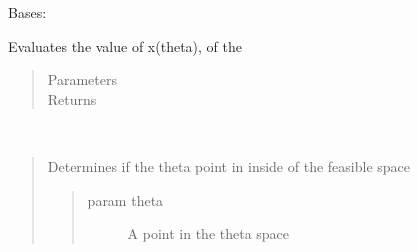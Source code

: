 \documentclass[letterpaper,10pt,english]{sphinxmanual}
\begin{document}
\begin{fulllineitems}
\label{\detokenize{mpo.upop:mpo.upop.point_location.PointLocation}}
\sphinxAtStartPar
Bases: 

\begin{fulllineitems}
\label{\detokenize{mpo.upop:mpo.upop.point_location.PointLocation.evaluate}}
\sphinxAtStartPar
Evaluates the value of x(theta), of the
\begin{quote}\begin{description}
\item[{Parameters}] \leavevmode
\sphinxAtStartPar
{} \textendash{} 

\item[{Returns}] \leavevmode
\sphinxAtStartPar


\end{description}\end{quote}

\end{fulllineitems}


\begin{fulllineitems}
\label{\detokenize{mpo.upop:mpo.upop.point_location.PointLocation.is_inside}}~\begin{quote}

\sphinxAtStartPar
Determines if the theta point in inside of the feasible space
\begin{quote}\begin{description}
\item[{param theta}] \leavevmode
\sphinxAtStartPar
A point in the theta space


\end{description}
\end{quote}
\end{quote}
\end{fulllineitems}
\end{fulllineitems}
\end{document}
